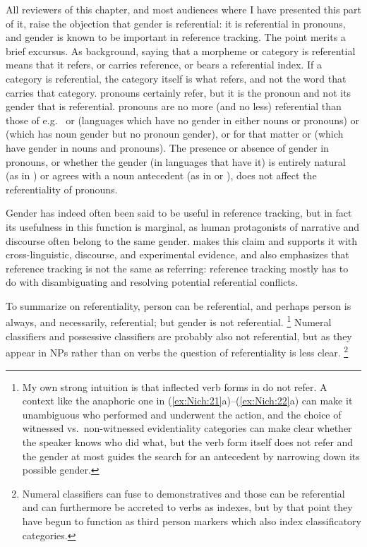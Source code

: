 \documentclass[output=collectionpaper]{langsci/langscibook}
\begin{document}
All reviewers of this chapter, and most audiences where I have presented this part of it, raise the objection that gender is referential: it is referential in  pronouns, and gender is known to be important in reference tracking. The point merits a brief excursus. As background, saying that a morpheme or category is referential means that it refers, or carries reference, or bears a referential index. If a category is referential, the category itself is what refers, and not the word that carries that category.  pronouns certainly refer, but it is the pronoun and not its gender that is referential.  pronouns are no more (and no less) referential than those of e.g.\  or  (languages which have no gender in either nouns or pronouns) or  (which has noun gender but no pronoun gender), or for that matter  or  (which have gender in nouns and pronouns). The presence or absence of gender in pronouns, or whether the gender (in languages that have it) is entirely natural (as in ) or agrees with a noun antecedent (as in  or ), does not affect the referentiality of pronouns.

Gender has indeed often been said to be useful in reference tracking, but in fact its usefulness in this function is marginal, as human protagonists of narrative and discourse often belong to the same gender. \citet[334--360]{Kibrik2011} makes this claim and supports it with cross-linguistic, discourse, and experimental evidence, and also emphasizes that reference tracking is not the same as referring: reference tracking mostly has to do with disambiguating and resolving potential referential conflicts.

\largerpage
To summarize on referentiality, person can be referential, and perhaps person is always, and necessarily, referential; but gender is not referential.%
\footnote{%
My own strong intuition is that inflected verb forms in  do not refer. A context like the anaphoric one in (\ref{ex:Nich:21}a)--(\ref{ex:Nich:22}a) can make it unambiguous who performed and underwent the action, and the choice of witnessed vs.\ non-witnessed evidentiality categories can make clear whether the speaker knows who did what, but the verb form itself does not refer and the gender at most guides the search for an antecedent by narrowing down its possible gender.
} %
Numeral classifiers and possessive classifiers are probably also not referential, but as they appear in NPs rather than on verbs the question of referentiality is less clear.%
\footnote{%
Numeral classifiers can fuse to demonstratives and those can be referential and can furthermore be accreted to verbs as indexes, but by that point they have begun to function as third person markers which also index classificatory categories.
}%
\end{document}
